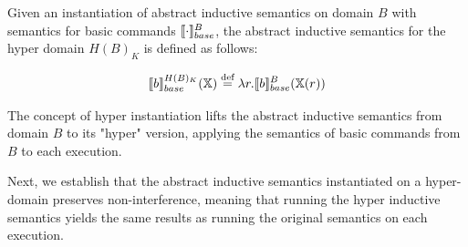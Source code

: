 \documentclass[
  10pt,       %
  twoside,    %
  a4paper,    %
  english,    %
  tikz,       %
  openright,  %
]{book}
\begin{document}
\begin{definition}
  Given an instantiation of abstract inductive semantics on domain $B$ with
  semantics for basic commands $\llbracket \cdot \rrbracket_{base}^B$, the abstract inductive
  semantics for the hyper domain $H(B)_K$ is defined as follows:

  $$\llbracket b \rrbracket_{base}^{H(B)_K}(\mathbb{X}) \stackrel{\text{def}}{=} \lambda r . \llbracket b \rrbracket_{base}^B(\mathbb{X}(r))$$
\end{definition}

The concept of hyper instantiation lifts the abstract inductive semantics from
domain $B$ to its "hyper" version, applying the semantics of basic commands
from $B$ to each execution.

Next, we establish that the abstract inductive semantics instantiated on a
hyper-domain preserves non-interference, meaning that running the hyper
inductive semantics yields the same results as running the original semantics
on each execution.
\end{document}
